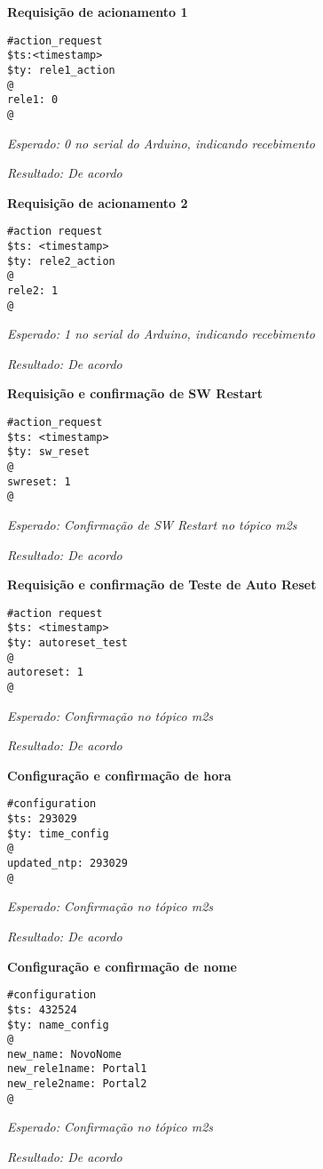 \textbf{Requisição de acionamento 1}
\begin{lstlisting}
#action_request
$ts:<timestamp>
$ty: rele1_action
@
rele1: 0
@
\end{lstlisting}

\emph{Esperado: 0 no serial do Arduino, indicando recebimento}

\emph{Resultado: De acordo}

\textbf{Requisição de acionamento 2}
\begin{lstlisting}
#action request
$ts: <timestamp>
$ty: rele2_action
@
rele2: 1
@
\end{lstlisting}

\emph{Esperado: 1 no serial do Arduino, indicando recebimento}

\emph{Resultado: De acordo}

\textbf{Requisição e confirmação de SW Restart}
\begin{lstlisting}
#action_request
$ts: <timestamp>
$ty: sw_reset
@
swreset: 1
@
\end{lstlisting}

\emph{Esperado: Confirmação de SW Restart no tópico \wmqtt{} m2s}

\emph{Resultado: De acordo}

\textbf{Requisição e confirmação de Teste de Auto Reset}
\begin{lstlisting}
#action request
$ts: <timestamp>
$ty: autoreset_test
@
autoreset: 1
@
\end{lstlisting}

\emph{Esperado: Confirmação no tópico \wmqtt{} m2s}

\emph{Resultado: De acordo}

\textbf{Configuração e confirmação de hora}
\begin{lstlisting}
#configuration
$ts: 293029
$ty: time_config
@
updated_ntp: 293029
@
\end{lstlisting}

\emph{Esperado: Confirmação no tópico \wmqtt{} m2s}

\emph{Resultado: De acordo}

\textbf{Configuração e confirmação de nome}
\begin{lstlisting}
#configuration
$ts: 432524
$ty: name_config
@
new_name: NovoNome
new_rele1name: Portal1
new_rele2name: Portal2
@
\end{lstlisting}

\emph{Esperado: Confirmação no tópico \wmqtt{} m2s}

\emph{Resultado: De acordo}

